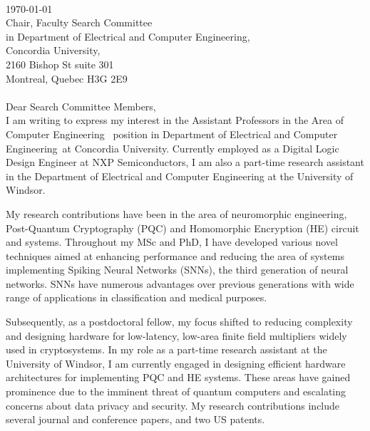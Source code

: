 \documentclass[12pt,oneside]{book}
\newcommand{\position}{Assistant Professors in the Area of Computer Engineering }
\newcommand{\department}{in  Department of Electrical and Computer Engineering}
\newcommand{\university}{Concordia University}
\begin{document}
\thispagestyle{empty}
\vspace*{-5em} \phantom \quad \\
\today\\
Chair, Faculty Search Committee\\
\department ,\\
\university ,\\
2160 Bishop St suite 301 \\
Montreal, Quebec H3G 2E9\\
\phantom \quad \\
Dear Search Committee Members,\\

I am writing to express my interest in  the \position ~position   \department ~at \university . Currently employed as a Digital Logic Design Engineer at NXP Semiconductors, I am also a part-time research assistant in the Department of Electrical and Computer Engineering at the University of Windsor.

My research contributions have been in the area of neuromorphic engineering, Post-Quantum Cryptography (PQC) and Homomorphic Encryption (HE) circuit and systems.  
Throughout my MSc and PhD, I  have developed various novel techniques aimed at enhancing performance and reducing the area of systems implementing Spiking Neural Networks (SNNs), the third generation of neural networks. SNNs have numerous advantages over previous generations with wide range of applications  in classification and medical purposes.   


Subsequently, as a postdoctoral fellow, my focus shifted to reducing complexity and designing hardware for low-latency, low-area finite field multipliers widely used in cryptosystems.
In my role as a part-time research assistant at the University of Windsor, I am currently engaged in designing efficient hardware architectures for implementing PQC and HE systems. These areas have gained prominence due to the imminent threat of quantum computers and escalating concerns about data privacy and security.  My research contributions include several journal and conference papers, and two US patents. 
\end{document}
